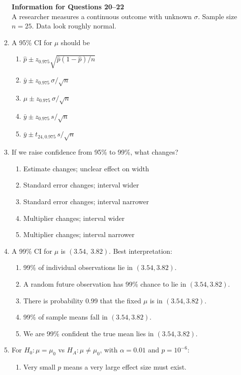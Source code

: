 \documentclass{article}
\begin{document}
\begin{enumerate}
\textbf{Information for Questions 20--22}\\
A researcher measures a continuous outcome with unknown $\sigma$. Sample size $n=25$. Data look roughly normal.
\item A 95\% CI for $\mu$ should be
    \begin{enumerate}[label=\Alph*.]
        \item $\hat p \pm z_{0.975}\sqrt{\hat p(1-\hat p)/n}$
        \item $\bar y \pm z_{0.975}\,\sigma/\sqrt n$
        \item $\mu \pm z_{0.975}\,\sigma/\sqrt n$
        \item $\bar y \pm z_{0.975}\, s/\sqrt n$
        \item $\bar y \pm t_{24,0.975}\, s/\sqrt n$
    \end{enumerate}
\item If we raise confidence from 95\% to 99\%, what changes?
    \begin{enumerate}[label=\Alph*.]
        \item Estimate changes; unclear effect on width
        \item Standard error changes; interval wider
        \item Standard error changes; interval narrower
        \item Multiplier changes; interval wider
        \item Multiplier changes; interval narrower
    \end{enumerate}
\item A 99\% CI for $\mu$ is $(3.54,\ 3.82)$. Best interpretation:
    \begin{enumerate}[label=\Alph*.]
        \item 99\% of individual observations lie in $(3.54,3.82)$.
        \item A random future observation has 99\% chance to lie in $(3.54,3.82)$.
        \item There is probability 0.99 that the fixed $\mu$ is in $(3.54,3.82)$.
        \item 99\% of sample means fall in $(3.54,3.82)$.
        \item We are 99\% confident the true mean lies in $(3.54,3.82)$.
    \end{enumerate}
\item For $H_0:\mu=\mu_0$ vs $H_A:\mu\neq \mu_0$, with $\alpha=0.01$ and $p=10^{-6}$:
    \begin{enumerate}[label=\Alph*.]
        \item Very small $p$ means a very large effect size must exist.

\end{enumerate}
\end{enumerate}
\end{document}
